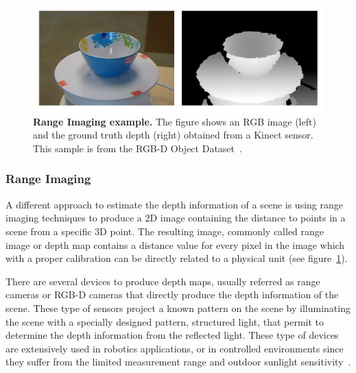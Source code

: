 \begin{figure}
	\centering
    \includegraphics[width=\textwidth]{main/introduction/images/rgbd_kinect.png}
    \caption[Range Imaging example]{\textbf{Range Imaging example.} The figure shows an RGB image (left) and the ground truth depth (right) obtained from a Kinect sensor. This sample is from the RGB-D Object Dataset~\cite{lai2011}.}
	\label{fig:kinect_image}
\end{figure}

\subsubsection{Range Imaging}

A different approach to estimate the depth information of a scene is using range imaging techniques to produce a 2D image containing the distance to points in a scene from a specific 3D point. The resulting image, commonly called range image or depth map contains a distance value for every pixel in the image which with a proper calibration can be directly related to a physical unit (see figure~\ref{fig:kinect_image}).

There are several devices to produce depth maps, usually referred as range cameras or RGB-D cameras that directly produce the depth information of the scene. These type of sensors project a known pattern on the scene by illuminating the scene with a specially designed pattern, structured light, that permit to determine the depth information from the reflected light. These type of devices are extensively used in robotics applications, or in controlled environments since they suffer from the limited measurement range and outdoor sunlight sensitivity~\cite{tateno2017cnnslam}.


